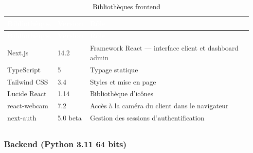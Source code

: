 \renewcommand{\arraystretch}{1.3}
\begin{longtable}{|p{3.5cm}|p{1.5cm}|p{9.5cm}|}
  \rowcolor{bleu_principal}
  \textcolor{white}{\textbf{Bibliothèque}} & \textcolor{white}{\textbf{Version}} & \textcolor{white}{\textbf{Rôle}} \\
  \hline
  \endfirsthead
  \rowcolor{bleu_principal}
  \textcolor{white}{\textbf{Bibliothèque}} & \textcolor{white}{\textbf{Version}} & \textcolor{white}{\textbf{Rôle}} \\
  \hline
  \endhead
  Next.js         & 14.2      & Framework React — interface client et dashboard admin \\ \hline
  TypeScript      & 5         & Typage statique \\ \hline
  Tailwind CSS    & 3.4       & Styles et mise en page \\ \hline
  Lucide React    & 1.14      & Bibliothèque d'icônes \\ \hline
  react-webcam    & 7.2       & Accès à la caméra du client dans le navigateur \\ \hline
  next-auth       & 5.0 beta  & Gestion des sessions d'authentification \\ \hline
  \caption{Bibliothèques frontend}
  \label{tab:ch6-frontend}
\end{longtable}

\subsubsection{Backend (Python 3.11 64 bits)}

